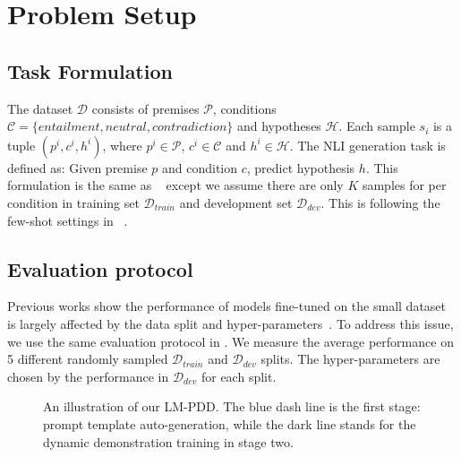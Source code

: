 \section{Problem Setup}

\subsection{Task Formulation}

The dataset $\mathcal{D}$ consists of premises $\mathcal{P}$, conditions $\mathcal{C}=\{entailment, neutral, contradiction\}$ and hypotheses $\mathcal{H}$. Each sample $s_i$ is a tuple $(p^i, c^i, h^i)$, where $p^i \in \mathcal{P}$, $c^i \in \mathcal{C}$ and $h^i \in \mathcal{H}$. The NLI generation task is defined as: Given premise $p$ and condition $c$, predict hypothesis $h$. This formulation is the same as ~\citet{DBLP:journals/csl/StarcM17} except we assume there are only $K$
samples for per condition in training set $\mathcal{D}_{train}$ and development set $\mathcal{D}_{dev}$. This is following the few-shot settings in ~\citet{DBLP:conf/acl/GaoFC20}.

\subsection{Evaluation protocol}

Previous works show the performance of models fine-tuned on the small dataset is largely affected by the data split and hyper-parameters~\citep{DBLP:journals/corr/abs-2002-06305,DBLP:conf/iclr/0007WKWA21}. 
To address this issue, we use the same evaluation protocol in 
\citet{DBLP:conf/acl/GaoFC20}. We measure the average performance on 
5 different randomly sampled $\mathcal{D}_{train}$ and $\mathcal{D}_{dev}$ 
splits. The hyper-parameters are chosen by the performance in 
$\mathcal{D}_{dev}$ for each split.

\begin{figure}
	\centering
	\caption{An illustration of our LM-PDD. The blue dash line is the first stage: prompt template auto-generation, while the dark line stands for the dynamic demonstration training in stage two.}
	\label{fig:model}
\end{figure}

